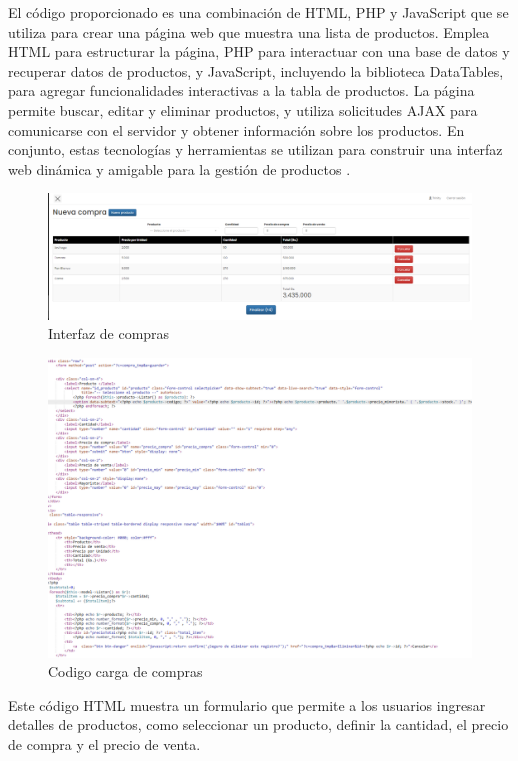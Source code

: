 El código proporcionado es una combinación de HTML, PHP y JavaScript que se utiliza para crear una página web que muestra una lista de productos. Emplea HTML para estructurar la página, PHP para interactuar con una base de datos y recuperar datos de productos, y JavaScript, incluyendo la biblioteca DataTables, para agregar funcionalidades interactivas a la tabla de productos. La página permite buscar, editar y eliminar productos, y utiliza solicitudes AJAX para comunicarse con el servidor y obtener información sobre los productos. En conjunto, estas tecnologías y herramientas se utilizan para construir una interfaz web dinámica y amigable para la gestión de productos \cite{mohedano2012iniciacion}.

\begin{figure}[H]
    \begin{center}
      \includegraphics[scale=0.30]{./sistema/compras.png}
      \caption{Interfaz de compras }
      \label{fig:product}
    \end{center}
  \end{figure}
  \begin{figure}[H]
    \begin{center}
      \includegraphics[scale=0.55]{./sistema/codigo_compra.png}
      \caption{Codigo carga de compras }
      \label{fig:product}
    \end{center}
  \end{figure}
  Este código HTML muestra un formulario que permite a los usuarios ingresar detalles de productos, como seleccionar un producto, definir la cantidad, el precio de compra y el precio de venta.

